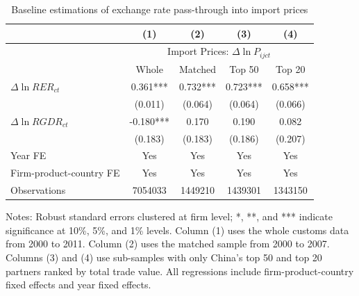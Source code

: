 \documentclass[12pt]{article}
\begin{document}
\begin{table}[htbp]
	\centering
	\caption{Baseline estimations of exchange rate pass-through into import prices}
	\begin{threeparttable}
		\begin{tabular}{lcccc}
			\toprule
			& (1)   & (2)   & (3)   & (4) \\
			\midrule
			& \multicolumn{4}{c}{Import Prices: $\Delta \ln P_{ijct}$} \\
			& Whole & Matched & Top 50 & Top 20 \\
			\midrule
			$\Delta \ln RER_{ct}$ & 0.361*** & 0.732*** & 0.723*** & 0.658*** \\
			& (0.011) & (0.064) & (0.064) & (0.066) \\
			$\Delta \ln RGDR_{ct}$ & -0.180*** & 0.170 & 0.190 & 0.082 \\
			& (0.183) & (0.183) & (0.186) & (0.207) \\
			Year FE  & Yes   & Yes   & Yes   & Yes \\
			Firm-product-country FE & Yes   & Yes   & Yes   & Yes \\
			Observations & 7054033 & 1449210 & 1439301 & 1343150 \\
			\bottomrule
		\end{tabular}
		\begin{tablenotes}
			\footnotesize
			\item[Notes:] Robust standard errors clustered at firm level;  *, **, and *** indicate significance at 10\%, 5\%, and 1\% levels. Column (1) uses the whole customs data from 2000 to 2011. Column (2) uses the matched sample from 2000 to 2007. Columns (3) and (4) use sub-samples with only China's top 50 and top 20 partners ranked by total trade value. All regressions include firm-product-country fixed effects and year fixed effects. 
		\end{tablenotes}
	\end{threeparttable}
	\label{tab.baseline}
\end{table}
\end{document}
